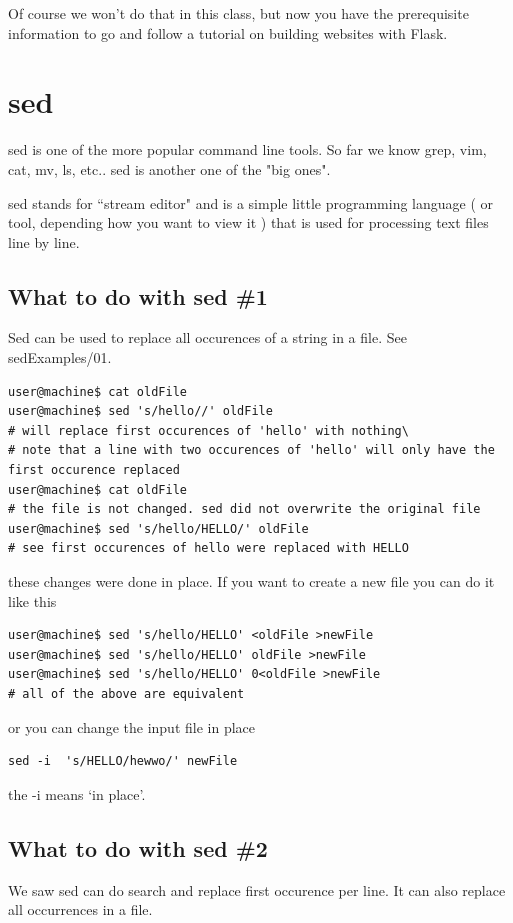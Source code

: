 \documentclass[10pt]{article}
\begin{document}
Of course we won't do that in this class, but now you have the prerequisite information to go and follow a tutorial on building websites with Flask.

\section{sed}
sed is one of the more popular command line tools. So far we know grep, vim, cat, mv, ls, etc.. sed is another one of the "big ones".

sed stands for ``stream editor" and is a simple little programming language ( or tool, depending how you want to view it ) that is used for processing text files line by line.

\subsection{What to do with sed \#1}
Sed can be used to replace all occurences of a string in a file.
See sedExamples/01.

\begin{lstlisting}[style=term]
user@machine$ cat oldFile
user@machine$ sed 's/hello//' oldFile
# will replace first occurences of 'hello' with nothing\
# note that a line with two occurences of 'hello' will only have the first occurence replaced
user@machine$ cat oldFile
# the file is not changed. sed did not overwrite the original file
user@machine$ sed 's/hello/HELLO/' oldFile
# see first occurences of hello were replaced with HELLO
\end{lstlisting}

these changes were done in place. If you want to create a new file you can do it like this

\begin{lstlisting}[style=term]
user@machine$ sed 's/hello/HELLO' <oldFile >newFile
user@machine$ sed 's/hello/HELLO' oldFile >newFile
user@machine$ sed 's/hello/HELLO' 0<oldFile >newFile
# all of the above are equivalent
\end{lstlisting}

or you can change the input file in place

\begin{lstlisting}[style=term]
sed -i  's/HELLO/hewwo/' newFile
\end{lstlisting}

the -i means `in place'.

\subsection{What to do with sed \#2}
We saw sed can do search and replace first occurence per line. It can also replace all occurrences in a file.
\end{document}
